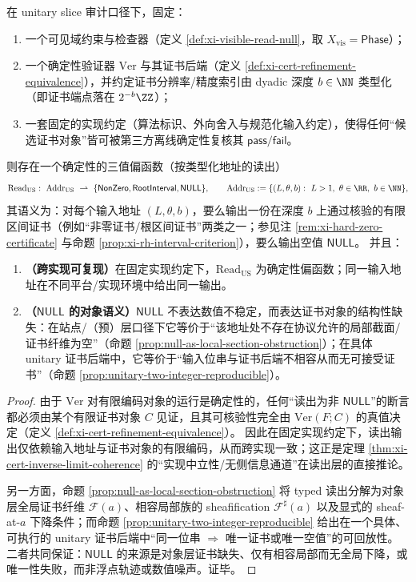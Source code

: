 \begin{theorem}\label{thm:xi-us-deterministic-tristate}
在 unitary slice 审计口径下，固定：
\begin{enumerate}
  \item 一个可见域约束与检查器（定义 \ref{def:xi-visible-read-null}，取 \(X_{\mathrm{vis}}=\mathsf{Phase}\)）；
  \item 一个确定性验证器 \(\mathrm{Ver}\) 与其证书后端（定义 \ref{def:xi-cert-refinement-equivalence}），并约定证书分辨率/精度索引由 dyadic 深度 \(b\in\NN\) 类型化（即证书端点落在 \(2^{-b}\ZZ\)）；
  \item 一套固定的实现约定（算法标识、外向舍入与规范化输入约定），使得任何“候选证书对象”皆可被第三方离线确定性复核其 \(\mathsf{pass}/\mathsf{fail}\)。
\end{enumerate}
则存在一个确定性的三值偏函数（按类型化地址的读出）
\[
\mathrm{Read}_{\mathrm{US}}:\ \mathrm{Addr}_{\mathrm{US}}\ \rightharpoonup\ \{\mathsf{NonZero},\mathsf{RootInterval},\mathsf{NULL}\},
\qquad
\mathrm{Addr}_{\mathrm{US}}:=\{(L,\theta,b):\ L>1,\ \theta\in\RR,\ b\in\NN\},
\]
其语义为：对每个输入地址 \((L,\theta,b)\)，要么输出一份在深度 \(b\) 上通过核验的有限区间证书（例如“非零证书/根区间证书”两类之一；参见注 \ref{rem:xi-hard-zero-certificate} 与命题 \ref{prop:xi-rh-interval-criterion}），要么输出空值 \(\mathsf{NULL}\)。
并且：
\begin{enumerate}
  \item \textbf{（跨实现可复现）}在固定实现约定下，\(\mathrm{Read}_{\mathrm{US}}\) 为确定性偏函数；同一输入地址在不同平台/实现环境中给出同一输出。
  \item \textbf{（\(\mathsf{NULL}\) 的对象语义）}\(\mathsf{NULL}\) 不表达数值不稳定，而表达证书对象的结构性缺失：在站点/（预）层口径下它等价于“该地址处不存在协议允许的局部截面/证书纤维为空”（命题 \ref{prop:null-as-local-section-obstruction}）；在具体 unitary 证书后端中，它等价于“输入位串与证书后端不相容从而无可接受证书”（命题 \ref{prop:unitary-two-integer-reproducible}）。
\end{enumerate}
\end{theorem}

\begin{proof}
由于 \(\mathrm{Ver}\) 对有限编码对象的运行是确定性的，任何“读出为非 \(\mathsf{NULL}\)”的断言都必须由某个有限证书对象 \(C\) 见证，且其可核验性完全由 \(\mathrm{Ver}(F;C)\) 的真值决定（定义 \ref{def:xi-cert-refinement-equivalence}）。
因此在固定实现约定下，读出输出仅依赖输入地址与证书对象的有限编码，从而跨实现一致；这正是定理 \ref{thm:xi-cert-inverse-limit-coherence} 的“实现中立性/无侧信息通道”在读出层的直接推论。
\par
另一方面，命题 \ref{prop:null-as-local-section-obstruction} 将 typed 读出分解为对象层全局证书纤维 \(\mathscr F(a)\)、相容局部族的 sheafification \(\mathscr F^\sharp(a)\) 以及显式的 sheaf-at-\(a\) 下降条件；而命题 \ref{prop:unitary-two-integer-reproducible} 给出在一个具体、可执行的 unitary 证书后端中“同一位串 \(\Rightarrow\) 唯一证书或唯一空值”的可回放性。
二者共同保证：\(\mathsf{NULL}\) 的来源是对象层证书缺失、仅有相容局部而无全局下降，或唯一性失败，而非浮点轨迹或数值噪声。证毕。
\end{proof}

